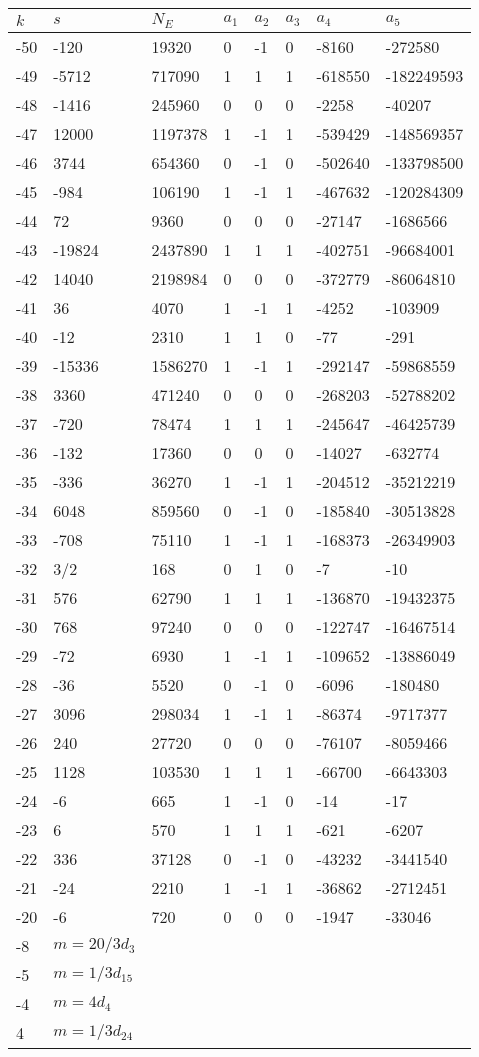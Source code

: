 \documentclass{amsart}
\begin{document}
\begin{longtable}{|l|l|l|lllll|}
\hline
$k$ & $s$ & $N_E$ & $a_1$ & $a_2$ & $a_3$ & $a_4$ & $a_5$\\
\hline
-50&-120&19320&0&-1&0&-8160&-272580\\
-49&-5712&717090&1&1&1&-618550&-182249593\\
-48&-1416&245960&0&0&0&-2258&-40207\\
-47&12000&1197378&1&-1&1&-539429&-148569357\\
-46&3744&654360&0&-1&0&-502640&-133798500\\
-45&-984&106190&1&-1&1&-467632&-120284309\\
-44&72&9360&0&0&0&-27147&-1686566\\
-43&-19824&2437890&1&1&1&-402751&-96684001\\
-42&14040&2198984&0&0&0&-372779&-86064810\\
-41&36&4070&1&-1&1&-4252&-103909\\
-40&-12&2310&1&1&0&-77&-291\\
-39&-15336&1586270&1&-1&1&-292147&-59868559\\
-38&3360&471240&0&0&0&-268203&-52788202\\
-37&-720&78474&1&1&1&-245647&-46425739\\
-36&-132&17360&0&0&0&-14027&-632774\\
-35&-336&36270&1&-1&1&-204512&-35212219\\
-34&6048&859560&0&-1&0&-185840&-30513828\\
-33&-708&75110&1&-1&1&-168373&-26349903\\
-32&3/2&168&0&1&0&-7&-10\\
-31&576&62790&1&1&1&-136870&-19432375\\
-30&768&97240&0&0&0&-122747&-16467514\\
-29&-72&6930&1&-1&1&-109652&-13886049\\
-28&-36&5520&0&-1&0&-6096&-180480\\
-27&3096&298034&1&-1&1&-86374&-9717377\\
-26&240&27720&0&0&0&-76107&-8059466\\
-25&1128&103530&1&1&1&-66700&-6643303\\
-24&-6&665&1&-1&0&-14&-17\\
-23&6&570&1&1&1&-621&-6207\\
-22&336&37128&0&-1&0&-43232&-3441540\\
-21&-24&2210&1&-1&1&-36862&-2712451\\
-20&-6&720&0&0&0&-1947&-33046\\
-8&$m=20/3d_{3}$&&\multicolumn{5}{c|}{}\\
-5&$m=1/3d_{15}$&&\multicolumn{5}{c|}{}\\
-4&$m=4d_{4}$&&\multicolumn{5}{c|}{}\\
4&$m=1/3d_{24}$&&\multicolumn{5}{c|}{}\\
\hline
\end{longtable}
\end{document}
